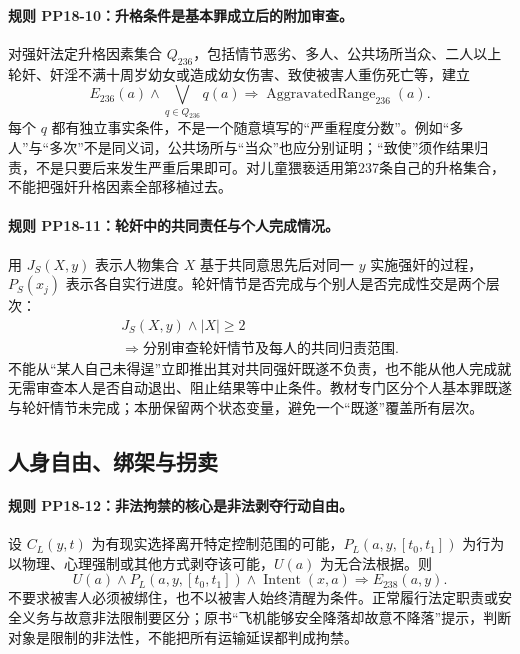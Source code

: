 \paragraph{规则 PP18-10：升格条件是基本罪成立后的附加审查。}
\mbox{}\par
对强奸法定升格因素集合 $Q_{236}$，包括情节恶劣、多人、公共场所当众、二人以上轮奸、奸淫不满十周岁幼女或造成幼女伤害、致使被害人重伤死亡等，建立
\[
E_{236}(a)\land\bigvee_{q\in Q_{236}}q(a)
\Rightarrow\operatorname{AggravatedRange}_{236}(a).
\]
每个 $q$ 都有独立事实条件，不是一个随意填写的“严重程度分数”。例如“多人”与“多次”不是同义词，公共场所与“当众”也应分别证明；“致使”须作结果归责，不是只要后来发生严重后果即可。对儿童猥亵适用第237条自己的升格集合，不能把强奸升格因素全部移植过去。

\paragraph{规则 PP18-11：轮奸中的共同责任与个人完成情况。}
\mbox{}\par
用 $J_S(X,y)$ 表示人物集合 $X$ 基于共同意思先后对同一 $y$ 实施强奸的过程，$P_S(x_j)$ 表示各自实行进度。轮奸情节是否完成与个别人是否完成性交是两个层次：
\[
\begin{gathered}
J_S(X,y)\land |X|\ge2\\
\Rightarrow\text{分别审查轮奸情节及每人的共同归责范围}.
\end{gathered}
\]
不能从“某人自己未得逞”立即推出其对共同强奸既遂不负责，也不能从他人完成就无需审查本人是否自动退出、阻止结果等中止条件。教材专门区分个人基本罪既遂与轮奸情节未完成；本册保留两个状态变量，避免一个“既遂”覆盖所有层次。

\subsection{人身自由、绑架与拐卖}
\paragraph{规则 PP18-12：非法拘禁的核心是非法剥夺行动自由。}
\mbox{}\par
设 ${C_L}(y,t)$ 为有现实选择离开特定控制范围的可能，${P_L}(a,y,[t_0,t_1])$ 为行为以物理、心理强制或其他方式剥夺该可能，$U(a)$ 为无合法根据。则
\[
U(a)\land{P_L}(a,y,[t_0,t_1])
\land\operatorname{Intent}(x,a)
\Rightarrow E_{238}(a,y).
\]
不要求被害人必须被绑住，也不以被害人始终清醒为条件。正常履行法定职责或安全义务与故意非法限制要区分；原书“飞机能够安全降落却故意不降落”提示，判断对象是限制的非法性，不能把所有运输延误都判成拘禁。

